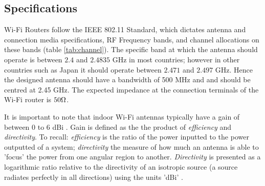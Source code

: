 \documentclass[10pt,twocolumn,hidelinks]{witseiepaper}
\begin{document}
\subsection{Specifications}
Wi-Fi Routers follow the IEEE 802.11 \cite{802.11} Standard, which dictates
antenna and connection media specifications, RF Frequency bands, and
channel allocations on these bands (table \ref{tab:channel}). The specific
band at which the antenna should operate is between $2.4$ and $2.4835$ GHz
in most countries; however in other countries such as Japan it should
operate between $2.471$ and $2.497$ GHz. Hence the designed antenna should
have a bandwidth of 500 MHz and and should be centred at 2.45 GHz. The
expected impedance at the connection terminals of the Wi-Fi router is
$50\ohm$.
\begin{table}[!h]
    \begin{center}
        \caption{2.4 GHz Wi-Fi Channel Allocations centred at Frequency $f$}
        \label{tab:channel}
    \end{center}
    \begin{center}
    \end{center}
\end{table}
It is important to note that indoor Wi-Fi antennas typically have a gain of
between 0 to 6 dBi \cite{wifiantenna}. Gain is defined as the the product
of \textit{efficiency} and \textit{directivity}. To recall:
\textit{efficiency} is the ratio of the power inputted to the power
outputted of a system; \textit{directivity} the measure of how much an
antenna is able to 'focus' the power from one angular region to another.
\textit{Directivity} is presented as a logarithmic ratio relative to the
directivity of an isotropic source (a source radiates perfectly in all
directions) using the units 'dBi' \cite[p. 18-20]{clark_fourie_2002}.
\end{document}
